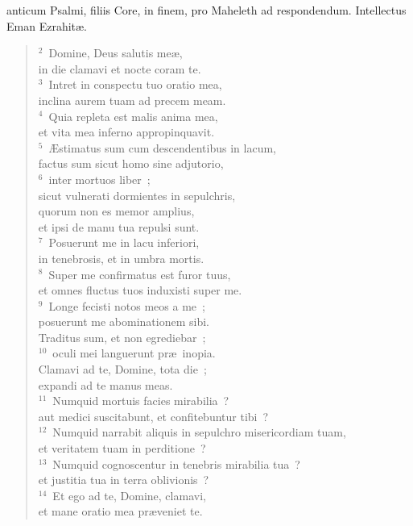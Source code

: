 \bchapter[Psalm]
anticum Psalmi, filiis Core, in finem, pro Maheleth ad respondendum. Intellectus Eman Ezrahit\ae .
\begin{verse}${}^{2}$~Domine, Deus salutis me\ae ,\\ in die clamavi et nocte coram te.\\
${}^{3}$~Intret in conspectu tuo oratio mea,\\ inclina aurem tuam ad precem meam.\\
${}^{4}$~Quia repleta est malis anima mea,\\ et vita mea inferno appropinquavit.\\
${}^{5}$~\AE stimatus sum cum descendentibus in lacum,\\ factus sum sicut homo sine adjutorio,\\
${}^{6}$~inter mortuos liber~;\\ sicut vulnerati dormientes in sepulchris,\\ quorum non es memor amplius,\\ et ipsi de manu tua repulsi sunt.\\
${}^{7}$~Posuerunt me in lacu inferiori,\\ in tenebrosis, et in umbra mortis.\\
${}^{8}$~Super me confirmatus est furor tuus,\\ et omnes fluctus tuos induxisti super me.\\
${}^{9}$~Longe fecisti notos meos a me~;\\ posuerunt me abominationem sibi.\\ Traditus sum, et non egrediebar~;\\
${}^{10}$~oculi mei languerunt pr\ae\ inopia.\\ Clamavi ad te, Domine, tota die~;\\ expandi ad te manus meas.\\
${}^{11}$~Numquid mortuis facies mirabilia~?\\ aut medici suscitabunt, et confitebuntur tibi~?\\
${}^{12}$~Numquid narrabit aliquis in sepulchro misericordiam tuam,\\ et veritatem tuam in perditione~?\\
${}^{13}$~Numquid cognoscentur in tenebris mirabilia tua~?\\ et justitia tua in terra oblivionis~?\\
${}^{14}$~Et ego ad te, Domine, clamavi,\\ et mane oratio mea pr\ae veniet te.\\

\end{verse}

